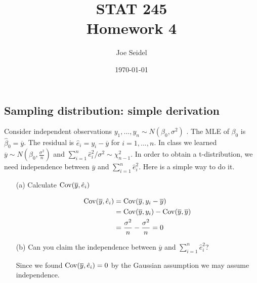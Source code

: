 \documentclass{tufte-book}
\title{STAT  245\\Homework 4}
\author{Joe Seidel}
\date{\today}
\begin{document}
\maketitle
{}
\newpage
{}

\subsection{Sampling distribution: simple derivation}
Consider independent observations $y_1,...,y_n \sim N(\beta_0, \sigma^2)$
.  The MLE of $\beta_0$ is $\hat{\beta}_0=\overline{y}$.  The residual is $\hat{e}_i=y_i-\overline{y}$ for $i=1,...,n$.  In class we learned $\overline{y}\sim N(\beta_0, \frac{\sigma^2}{n})$ and $\sum_{i=1}^n \hat{e}_i^2/\sigma^2 \sim \chi_{n-1}^2$.  In order to obtain a t-distribution, we need independence between $\overline{y}$ and $\sum_{i=1}^n \hat{e}_i^2$.  Here is a simple way to do it.

\begin{enumerate}

\item[(a)] Calculate $\operatorname{Cov}(\overline{y},\hat{e}_i)$

\begin{align*}
\operatorname{Cov}(\overline{y}, \hat{e}_i) &= \operatorname{Cov}(\overline{y},y_i-\overline{y})\\
&= \operatorname{Cov}(\overline{y}, y_i) - \operatorname{Cov}(\overline{y},\overline{y})\\
&= \frac{\sigma^2}{n} - \frac{\sigma^2}{n} = 0\\
\end{align*}

\item[(b)] Can you claim the independence between $\overline{y}$ and $\sum_{i=1}^n \hat{e}_i^2$?

Since we found $\operatorname{Cov}(\overline{y},\hat{e}_i)=0$ by the Gaussian assumption we may assume independence.

\end{enumerate}
\end{document}
